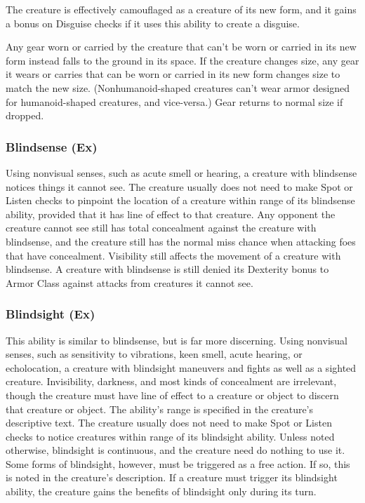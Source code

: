 \begin{itemize*}
\item The creature is effectively camouflaged as a creature of its new form, and it gains a   bonus on Disguise checks if it uses this ability to create a disguise.
\item Any gear worn or carried by the creature that can't be worn or carried in its new form instead falls to the ground in its space. If the creature changes size, any gear it wears or carries that can be worn or carried in its new form changes size to match the new size. (Nonhumanoid-shaped creatures can't wear armor designed for humanoid-shaped creatures, and vice-versa.) Gear returns to normal size if dropped.
\end{itemize*}

\subsubsection{Blindsense (Ex)} Using nonvisual senses, such as acute smell or hearing, a creature with blindsense notices things it cannot see. The creature usually does not need to make Spot or Listen checks to pinpoint the location of a creature within range of its blindsense ability, provided that it has line of effect to that creature. Any opponent the creature cannot see still has total concealment against the creature with blindsense, and the creature still has the normal miss chance when attacking foes that have concealment. Visibility still affects the movement of a creature with blindsense. A creature with blindsense is still denied its Dexterity bonus  to Armor Class against attacks from creatures it cannot see.

\subsubsection{Blindsight (Ex)} This ability is similar to blindsense, but is far more discerning. Using nonvisual senses, such as sensitivity to vibrations, keen smell, acute hearing, or echolocation, a creature with blindsight maneuvers and fights as well as a sighted creature. Invisibility, darkness, and most kinds of concealment are irrelevant, though the creature must have line of effect to a creature or object to discern that creature or object. The ability's range is specified in the creature's descriptive text. The creature usually does not need to make Spot or Listen checks to notice creatures within range of its blindsight ability. Unless noted otherwise, blindsight is continuous, and the creature need do nothing to use it. Some forms of blindsight, however, must be triggered as a free action. If so, this is noted in the creature's description. If a creature must trigger its blindsight ability, the creature gains the benefits of blindsight only during its turn.


